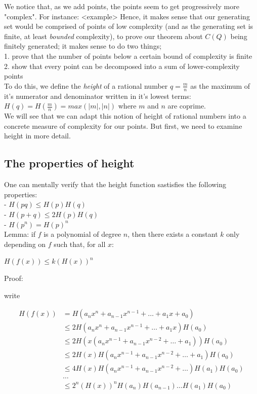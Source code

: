 \documentclass{article}
\begin{document}
We notice that, as we add points, the points seem to get progressively more "complex". For instance: <example>
Hence, it makes sense that our generating set would be comprised of points of low complexity (and as the generating set is finite, at least \emph{bounded} complexity), to prove our theorem about $C(Q)$ being finitely generated; it makes sense to do two things;\\

1. prove that the number of points below a certain bound of complexity is finite \\

2. show that every point can be decomposed into a sum of lower-complexity points \\

To do this, we define the \emph{height} of a rational number $q = \frac{m}{n}$ as the maximum of it's numerator and denominator written in it's lowest terms:\\

$H(q) = H(\frac{m}{n}) = max(|m|, |n|)$ where $m$ and $n$ are coprime.\\

We will see that we can adapt this notion of height of rational numbers into a concrete measure of complexity for our points. But first, we need to examine height in more detail.

\subsection{The properties of height}

One can mentally verify that the height function sastisfies the following properties:\\

- $H(pq) \leq H(p)H(q)$\\

- $H(p + q) \leq 2H(p)H(q)$\\

- $H(p^n) = H(p)^n$\\

Lemma: if $f$ is a polynomial of degree $n$, then there exists a constant $k$ only depending on $f$ such that, for all $x$:

$H(f(x)) \leq k(H(x))^n$

Proof:

write 

\begin{align*} 
H(f(x)) &= H(a_n x^n + a_{n-1}x^{n-1} + \dots + a_1 x + a_0)\\
&\leq 2H(a_n x^n + a_{n-1}x^{n-1} + \dots + a_1 x)H(a_0)\\
&\leq 2H(x(a_n x^{n-1} + a_{n-1}x^{n-2} + \dots + a_1))H(a_0)\\
&\leq 2H(x)H(a_n x^{n-1} + a_{n-1}x^{n-2} + \dots + a_1)H(a_0)\\
&\leq 4H(x)H(a_n x^{n-1} + a_{n-1}x^{n-2} + \dots)H(a_1)H(a_0)\\
&\dots\\
&\leq 2^n (H(x))^n H(a_n)H(a_{n-1})\dots H(a_1)H(a_0)
\end{align*} 
\end{document}
